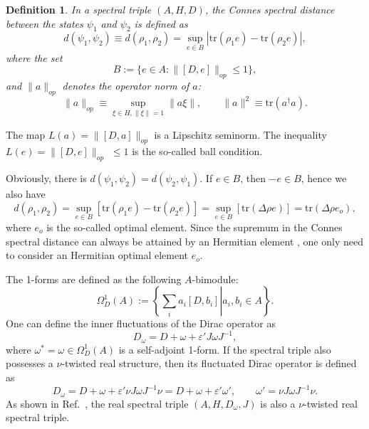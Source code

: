 \documentclass[a4paper,11pt]{article}
\newtheorem{definition}{Definition}
\begin{document}
\begin{definition}
  {\cite{Connes}} In a spectral triple $(A, H, D)$, the Connes spectral
  distance between the states $\psi_1$ and $\psi_2$ is defined as
  \begin{equation}
    d (\psi_1, \psi_2) \equiv d (\rho_1, \rho_2) = \sup_{e \in B} |
    \mathrm{tr} (\rho_1 e) - \mathrm{tr} (\rho_2 e) |,
  \end{equation}
  where the set
  \begin{equation}
    B := \{e \in A : \|[D, e]\|_{op} \leqslant 1\},
  \end{equation}
and $\|a\|_{op}$ denotes the operator norm of $a$:
  \begin{equation}
    \|a\|_{op} \equiv \sup_{\xi \in H,   \| \xi \| = 1} \|a \xi
    \|, \qquad \|a\|^2 \equiv \mathrm{tr} (a^{\dag} a) .
  \end{equation}
\end{definition}

The map $L (a) = \|[D, a]\|_{op}$ is a Lipschitz seminorm. The inequality $L
(e) = \|[D, e]\|_{op} $ $\leqslant 1$ is the so-called ball
condition.

Obviously, there is $d (\psi_1, \psi_2) = d (\psi_2, \psi_1)$. If $e \in B$,
then $- e \in B$, hence we also have
\begin{equation}
  d (\rho_1, \rho_2) = \sup_{e \in B} [\mathrm{tr} (\rho_1 e) - \mathrm{tr}
  (\rho_2 e)] = \sup_{e \in B} \left[ \mathrm{tr} (\Delta \rho  
  e) \right] = \mathrm{tr} (\Delta \rho   e_o),
\end{equation}
where $e_o$ is the so-called optimal element. Since the
supremum in the Connes spectral distance can always be attained by an
Hermitian element \cite{Iochum}, one only need to consider an Hermitian optimal
element $e_o$.

The 1-forms are defined as the following $A$-bimodule:
\begin{equation}
  \Omega_D^1 (A) := \left\{ \left. \sum_i a_i [D, b_i] \right| a_i, b_i \in A
  \right\} .
\end{equation}
One can define the inner fluctuations of the Dirac operator
as \cite{Magee}
\begin{equation}
  D_{\omega} = D + \omega + \varepsilon' J \omega J^{- 1},
\end{equation}
where $\omega^{\ast} = \omega \in \Omega_D^1 (A)$ is a self-adjoint 1-form. If
the spectral triple also possesses a $\nu$-twisted real structure, then its
fluctuated Dirac operator is defined as
\begin{equation}
  D_{\omega} = D + \omega + \varepsilon' \nu J \omega J^{- 1} \nu = D + \omega
  + \varepsilon' \omega', \qquad \omega' = \nu J \omega J^{- 1} \nu .
\end{equation}
As shown in Ref.~\cite{Magee}, the real spectral triple $(A, H, D_{\omega}, J)$ is also
a $\nu$-twisted real spectral triple.
\end{document}
